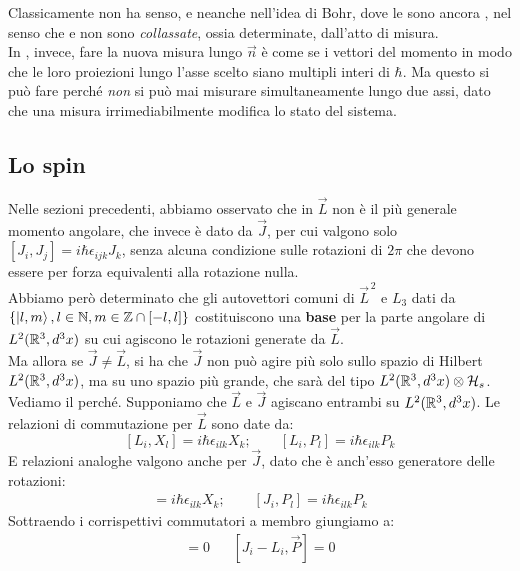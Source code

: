 \documentclass[../../FisicaTeorica.tex]{subfiles}
\begin{document}
\begin{itemize}
Classicamente non ha senso, e neanche nell'idea di Bohr, dove le  sono ancora , nel senso che  e non sono \textit{collassate}, ossia determinate, dall'atto di misura.\\
In \MQ, invece, fare la nuova misura lungo $\vec{n}$ è come se  i vettori del momento in modo che le loro proiezioni lungo l'asse scelto siano multipli interi di $\hbar$. Ma questo si può fare perché \textit{non} si può mai misurare simultaneamente lungo due assi, dato che una misura irrimediabilmente modifica lo stato del sistema.
\end{itemize}

\subsection{Lo spin}%
Nelle sezioni precedenti, abbiamo osservato che in \MQ $\vec{L}$ non è il più generale momento angolare, che invece è dato da $\vec{J}$, per cui valgono solo $[J_i, J_j]=i\hbar \epsilon_{ijk}J_k$, senza alcuna condizione sulle rotazioni di $2\pi$ che devono essere per forza equivalenti alla rotazione nulla.\\
Abbiamo però determinato che gli autovettori comuni di $\vec{L}^{\,2}$ e $L_3$ dati da $\{\Ket{l,m}, l\in \mathbb{N}, m \in \mathbb{Z}\cap [-l,l]\}$ costituiscono una \textbf{base} per la parte angolare di $L^2(\mathbb{R}^3, d^3x)$ su cui agiscono le rotazioni generate da $\vec{L}$.\\
Ma allora se $\vec{J}\neq \vec{L}$, si ha che $\vec{J}$ non può agire più solo sullo spazio di Hilbert $L^2(\mathbb{R}^3, d^3x)$, ma su uno spazio più grande, che sarà del tipo $L^2(\mathbb{R}^3, d^3x)\otimes \mathcal{H}_s$.\\
Vediamo il perché. Supponiamo che $\vec{L}$ e $\vec{J}$ agiscano entrambi su $L^2(\mathbb{R}^3, d^3x)$. Le relazioni di commutazione per $\vec{L}$ sono date da:
\[
[L_i, X_l] = i\hbar \epsilon_{ilk} X_k; \qquad [L_i, P_l]=i\hbar \epsilon_{ilk} P_k
\]
E relazioni analoghe valgono anche per $\vec{J}$, dato che è anch'esso generatore delle rotazioni:
\begin{align*}
[J_i,X_l]=i\hbar \epsilon_{ilk} X_k; \qquad [J_i, P_l]=i\hbar \epsilon_{ilk} P_k
\end{align*}
Sottraendo i corrispettivi commutatori a membro giungiamo a:
\begin{align*}
[J_i-L_i, \vec{X}]=0 && [J_i-L_i, \vec{P}]=0
\end{align*}
\end{document}
